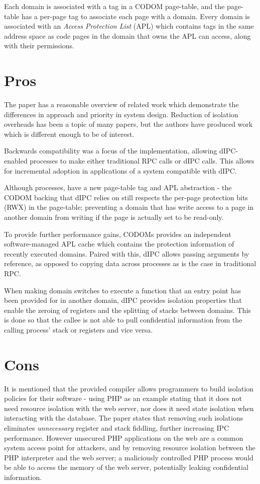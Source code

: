 \documentclass{article}
\begin{document}
Each domain is associated with a tag in a CODOM page-table, and the page-table has a per-page tag to associate each page with a domain. Every domain is  associated with an \textit{Access Protection List} (APL) which contains tags in the same address space as code pages in the domain that owns the APL can access, along with their permissions.

\section*{Pros}
The paper has a reasonable overview of related work which demonstrate the differences in approach and priority in system design. Reduction of isolation overheads has been a topic of many papers, but the authors have produced work which is different enough to be of interest.

Backwards compatibility was a focus of the implementation, allowing dIPC-enabled processes to make either traditional RPC calls or dIPC calls. This allows for incremental adoption in applications of a system compatible with dIPC.

Although processes, have a new page-table tag and APL abstraction - the CODOM backing that dIPC relies on still respects the per-page protection bits (RWX) in the page-table; preventing a domain that has write access to a page in another domain from writing if the page is actually set to be read-only.

To provide further performance gains, CODOMs provides an independent software-managed APL cache which contains the protection information of recently executed domains. Paired with this, dIPC allows passing arguments by reference, as opposed to copying data across processes as is the case in traditional RPC.

When making domain switches to execute a function that an entry point has been provided for in another domain, dIPC provides isolation properties that enable the zeroing of registers and the splitting of stacks between domains. This is done so that the callee is not able to pull confidential information from the calling process' stack or registers and vice versa.


\section*{Cons}
It is mentioned that the provided compiler allows programmers to build isolation policies for their software - using PHP as an example stating that it does not need resource isolation with the web server, nor does it need state isolation when interacting with the database. The paper states that removing such isolations eliminates \textit{unnecessary} register and stack fiddling, further increasing IPC performance. However unsecured PHP applications on the web are a common system access point for attackers, and by removing resource isolation between the PHP interpreter and the web server; a maliciously controlled PHP process would be able to access the memory of the web server, potentially leaking confidential information.
\end{document}
